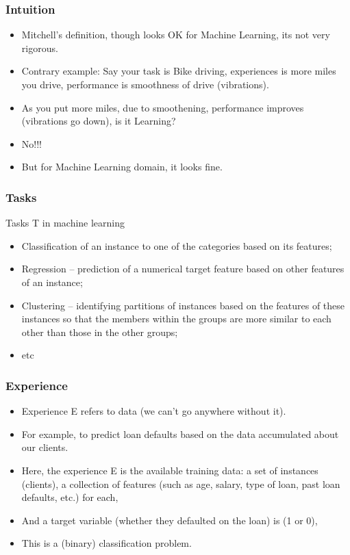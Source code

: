 \begin{frame}[fragile]\frametitle{Intuition}
\begin{itemize}
\item Mitchell's definition, though looks OK for Machine Learning, its not very rigorous.
\item Contrary example: Say your task is Bike driving, experiences is more miles you drive, performance is smoothness of drive (vibrations).
\item As you put more miles, due to smoothening, performance improves (vibrations go down), is it Learning? 
\item No!!!
\item But for Machine Learning domain, it looks fine.
\end{itemize}
\end{frame}

\begin{frame}[fragile]\frametitle{Tasks}
Tasks T in machine learning
\begin{itemize}
\item Classification of an instance to one of the categories based on its features;
\item Regression – prediction of a numerical target feature based on other features of an instance;
\item Clustering – identifying partitions of instances based on the features of these instances so that the members within the groups are more similar to each other than those in the other groups;
\item etc
\end{itemize}
\end{frame}


\begin{frame}[fragile]\frametitle{Experience}
\begin{itemize}
\item Experience E refers to data (we can't go anywhere without it).
\item For example, to predict loan defaults based on the data accumulated about our clients. 
\item Here, the experience E is the available training data: a set of instances (clients), a collection of features (such as age, salary, type of loan, past loan defaults, etc.) for each, 
\item And a target variable (whether they defaulted on the loan) is (1 or 0), 
\item This is a (binary) classification problem. 
\end{itemize}
\end{frame}

